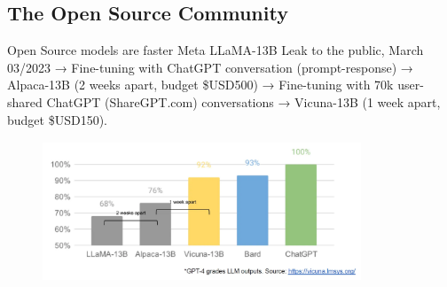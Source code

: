 \documentclass[9pt]{beamer}
\begin{document}
\subsection{The Open Source Community}
\begin{frame}{Open Source models are faster}  %
    Meta LLaMA-13B Leak to the public, March 03/2023 → Fine-tuning with ChatGPT conversation (prompt-response) → Alpaca-13B (2 weeks apart, budget \$USD500) → Fine-tuning with 70k user-shared ChatGPT (ShareGPT.com) conversations → Vicuna-13B (1 week apart, budget \$USD150).
    \begin{figure}
        \centering
        \includegraphics[width = 9.5cm, height=4.2cm]{img/vicuna-gpt-performance.png}
        \label{fig:enter-label}
    \end{figure}
\end{frame}
\end{document}

